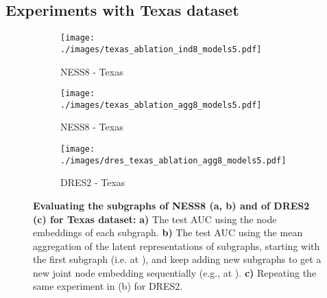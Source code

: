 \documentclass{article}
\begin{document}
\subsection{Experiments with Texas dataset}\label{aggregating_embeddings_texas}


\begin{figure}[ht]
\vskip 0.2in
\begin{center}
     \begin{subfigure}[c]{0.32\columnwidth}
        \texttt{[image: ./images/texas\_ablation\_ind8\_models5.pdf]}
         \caption{NESS8 - Texas}
     \end{subfigure}
     \begin{subfigure}[c]{0.29\columnwidth}
        \texttt{[image: ./images/texas\_ablation\_agg8\_models5.pdf]}
         \caption{NESS8 - Texas}
     \end{subfigure}
     \begin{subfigure}[c]{0.32\columnwidth}
        \texttt{[image: ./images/dres\_texas\_ablation\_agg8\_models5.pdf]}
         \caption{DRES2 - Texas}
     \end{subfigure}

\caption{\textbf{Evaluating the subgraphs of NESS8 (a, b) and of DRES2 (c) for Texas dataset:} \textbf{a)} The test AUC using the node embeddings of each subgraph. \textbf{b)} The test AUC using the mean aggregation of the latent representations of subgraphs, starting with the first subgraph (i.e.  at ), and keep adding new subgraphs to get a new joint node embedding sequentially (e.g.,  at ). \textbf{c)} Repeating the same experiment in (b) for DRES2.}\label{fig:gradual_aggregation_performance_texas}
\end{center}
\vskip -0.2in
\end{figure}
\end{document}
